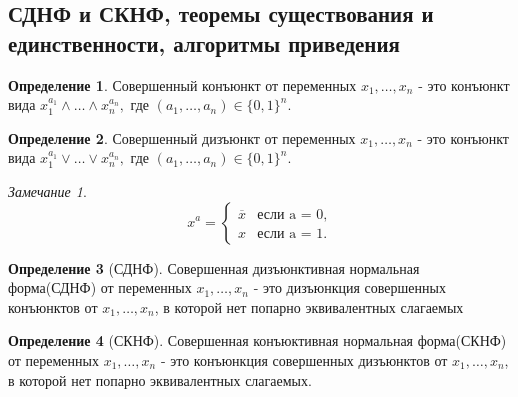 \documentclass[a4paper]{article}
\theoremstyle{definition}
\newtheorem*{definition}{Определение}
\theoremstyle{remark}
\newtheorem*{remark}{Замечание}
\begin{document}
    \subsection{СДНФ и СКНФ, теоремы существования и единственности, алгоритмы приведения}
	\begin{definition}
		Совершенный конъюнкт от переменных $x_1, \dots , x_n$ - это конъюнкт вида $x_1^{a_1} \wedge\dots \wedge x_n^{a_n},$ где $(a_1, \dots , a_n) \in \{0, 1\}^n.$
	\end{definition}
	\begin{definition}
		Совершенный дизъюнкт от переменных $x_1, \dots , x_n$ - это конъюнкт вида $x_1^{a_1} \vee\dots \vee x_n^{a_n},$ где $(a_1, \dots , a_n) \in \{0, 1\}^n.$
	\end{definition}
	\begin{remark}
		\begin{equation*}
			x^a = 
 			\begin{cases}
   				\overline{x} &\text{если a = 0,}\\
   				x &\text{если a = 1.}
 			\end{cases}
		\end{equation*}
	\end{remark}
	\begin{definition}[СДНФ]
		Совершенная дизъюнктивная нормальная форма(СДНФ) от переменных $x_1, \dots , x_n$  - это дизъюнкция совершенных конъюнктов от $x_1, \dots , x_n$, в которой нет попарно эквивалентных слагаемых
	\end{definition}
	\begin{definition}[СКНФ]
		Совершенная конъюктивная нормальная форма(СКНФ) от переменных $x_1, \dots , x_n$ - это конъюнкция совершенных дизъюнктов от $x_1, \dots , x_n$, в которой нет попарно эквивалентных слагаемых.
	\end{definition}
\end{document}
